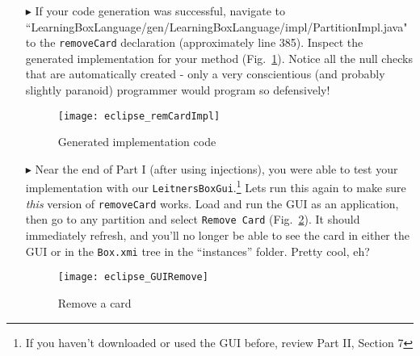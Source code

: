 \begin{itemize}

\item[$\blacktriangleright$] If your code generation was successful, navigate to 
``Learning\-Box\-Language/\-gen/\-Learning\-Box\-Language/\-impl/\-Partition\-Impl.java" to the \texttt{\-remove\-Card} declaration (approximately line 385).
Inspect the generated implementation for your method (Fig.~\ref{fig:remCardImpl}). Notice all the null checks that are automatically created - only a very conscientious
(and probably slightly paranoid) programmer would program so defensively!

\vspace{0.5cm}

\begin{figure}[htp]
\begin{center}
  \texttt{[image: eclipse\_remCardImpl]}
  \caption{Generated implementation code}
  \label{fig:remCardImpl}
\end{center}
\end{figure}

\newpage

\item[$\blacktriangleright$] Near the end of Part I (after using injections), you were able to test your implementation with our
\texttt{LeitnersBoxGui}.\footnote{If you haven't downloaded or used the GUI before, review Part II, Section 7} Lets run this again to make sure
\emph{this} version of \texttt{removeCard} works. Load and run the GUI as an application, then go to any partition and select
\texttt{Remove Card} (Fig.~\ref{fig:GUIRemCard}). It should immediately refresh, and you'll no longer be able to see the card in either the GUI or in the
\texttt{Box.xmi} tree in the ``instances'' folder. Pretty cool, eh?

\vspace{0.5cm}

\begin{figure}[htp]
\begin{center}
  \texttt{[image: eclipse\_GUIRemove]}
  \caption{Remove a card}
  \label{fig:GUIRemCard}
\end{center}
\end{figure}

\end{itemize}